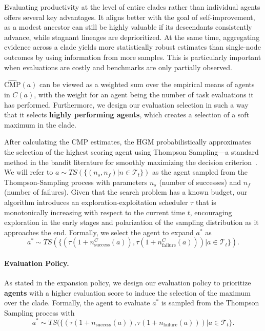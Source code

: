 \documentclass{article}
\begin{document}
Evaluating productivity at the level of entire clades rather than individual agents offers several key advantages. It aligns better with the goal of self-improvement, as a modest ancestor can still be highly valuable if its descendants consistently advance, while stagnant lineages are deprioritized. At the same time, aggregating evidence across a clade yields more statistically robust estimates than single-node outcomes by using information from more samples. This is particularly important when evaluations are costly and benchmarks are only partially observed. 

$\widehat{\mathrm{CMP}}(a)$ can be viewed as a weighted sum over the empirical means of agents in $C(a)$, with the weight for an agent being the number of task evaluations it has performed. Furthermore, we design our evaluation selection in such a way that it selects \textbf{highly performing agents}, which creates a selection of a soft maximum in the clade. 

After calculating the $\mathrm{CMP}$ estimates, the HGM probabilistically approximates the selection of the highest scoring agent using Thompson Sampling—a standard method in the bandit literature for smoothly maximizing the decision criterion~\citep{agrawal2012analysis,chapelle2011empirical}. We will refer to $a \sim TS(\{(n_s, n_f) | n\in \mathcal{T}_t \})$ as the agent sampled from the Thompson-Sampling process with parameters $n_s$ (number of successes) and $n_f$ (number of failures).
Given that the search problem has a known budget, our algorithm introduces an exploration-exploitation scheduler $\tau$ that is monotonically increasing with respect to the current time $t$, encouraging exploration in the early stages and polarization of the sampling distribution as it approaches the end. Formally, we select the agent to expand $a^*$ as 
\[
a^* \sim TS(\{(\tau(1+n_\text{success}^C(a)), \tau(1+n_\text{failure}^C(a))) | a\in \mathcal{T}_t \}).
\]


\paragraph{Evaluation Policy.}\label{method:eval-policy}
As stated in the expansion policy, we design our evaluation policy to prioritize \textbf{agents} with a higher evaluation score to induce the selection of the maximum over the clade. Formally, the agent to evaluate $a^*$ is sampled from the Thompson Sampling process with 
\[
a^* \sim TS(\{(\tau(1+n_\text{success}(a)), \tau(1+n_\text{failure}(a)) ) | a\in \mathcal{T}_t\}.
\]
\end{document}
